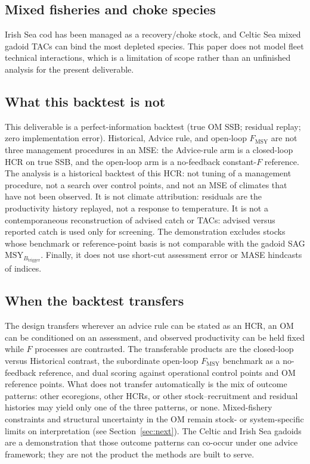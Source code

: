 \documentclass[11pt,a4paper]{article}
\newcommand{\Fmsy}{F_{\mathrm{MSY}}}
\newcommand{\Btrig}{\mathrm{MSY}_{B_{\mathrm{trigger}}}}
\begin{document}
\subsection{Mixed fisheries and choke species}
Irish Sea cod has been managed as a recovery/choke stock, and Celtic Sea
mixed gadoid TACs can bind the most depleted species. This paper does
not model fleet technical interactions, which is a limitation of scope
rather than an unfinished analysis for the present deliverable.

\subsection{What this backtest is not}
This deliverable is a perfect-information backtest (true OM SSB;
residual replay; zero implementation error). Historical, Advice rule, and
open-loop $\Fmsy$ are not three management procedures in an MSE: the
Advice-rule arm is a closed-loop HCR on true SSB, and the open-loop arm
is a no-feedback constant-$F$ reference. The analysis is a historical
backtest of this HCR: not tuning of a management procedure, not a search
over control points, and not an MSE of climates that have not been
observed. It is not climate attribution: residuals are the productivity
history replayed, not a response to temperature. It is not a
contemporaneous reconstruction of advised catch or TACs: advised versus
reported catch is used only for screening. The demonstration excludes
stocks whose benchmark or reference-point basis is not comparable with
the gadoid SAG $\Btrig$. Finally, it does not use short-cut assessment
error or MASE hindcasts of indices.

\subsection{When the backtest transfers}
The design transfers wherever an advice rule can be stated as an HCR,
an OM can be conditioned on an assessment, and observed productivity can
be held fixed while $F$ processes are contrasted. The transferable
products are the closed-loop versus Historical contrast, the subordinate
open-loop $\Fmsy$ benchmark as a no-feedback reference, and dual scoring
against operational control points and OM reference points. What does
not transfer automatically is the mix of outcome patterns: other
ecoregions, other HCRs, or other stock--recruitment and residual
histories may yield only one of the three patterns, or none.
Mixed-fishery constraints and structural uncertainty in the OM remain
stock- or system-specific limits on interpretation (see
Section~\ref{sec:next}). The Celtic and Irish Sea gadoids are a
demonstration that those outcome patterns can co-occur under one advice
framework; they are not the product the methods are built to serve.
\end{document}
